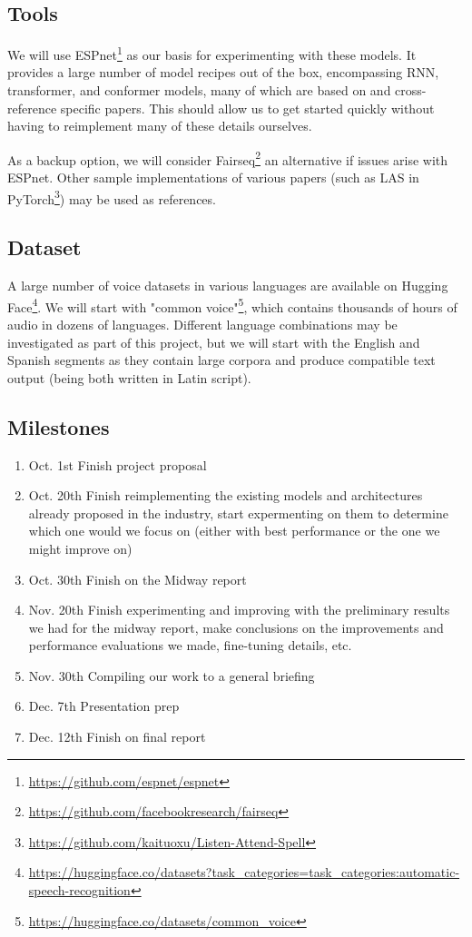 \documentclass{article}
\begin{document}
  \subsection{Tools}
  We will use ESPnet\footnote{\url{ https://github.com/espnet/espnet}} as our basis for experimenting with these models. It provides a large number of model recipes out of the box, encompassing RNN, transformer, and conformer models, many of which are based on and cross-reference specific papers. This should allow us to get started quickly without having to reimplement many of these details ourselves.
  
  As a backup option, we will consider Fairseq\footnote{\url{https://github.com/facebookresearch/fairseq}} an alternative if issues arise with ESPnet. Other sample implementations of various papers (such as LAS in PyTorch\footnote{\url{https://github.com/kaituoxu/Listen-Attend-Spell}}) may be used as references.
  \subsection{Dataset}
  A large number of voice datasets in various languages are available on Hugging Face\footnote{\url{ https://huggingface.co/datasets?task_categories=task_categories:automatic-speech-recognition}}. We will start with "common voice"\footnote{\url{ https://huggingface.co/datasets/common_voice}}, which contains thousands of hours of audio in dozens of languages. Different language combinations may be investigated as part of this project, but we will start with the English and Spanish segments as they contain large corpora and produce compatible text output (being both written in Latin script).
  \subsection{Milestones}
  \begin{enumerate}
    \item Oct. 1st Finish project proposal
    \item Oct. 20th Finish reimplementing the existing models and architectures already proposed in the industry, start expermenting on them to determine which one would we focus on (either with best performance or the one we might improve on)
    \item Oct. 30th  Finish on the Midway report
    \item Nov. 20th Finish experimenting and improving with the preliminary results we had for the midway report, make conclusions on the improvements and performance evaluations we made, fine-tuning details, etc.
    \item Nov. 30th Compiling our work to a general briefing
    \item Dec. 7th Presentation prep
    \item Dec. 12th Finish on final report
  \end{enumerate}
\end{document}
